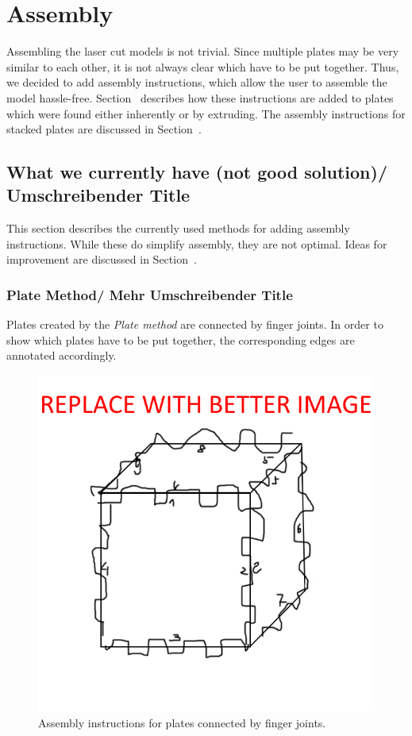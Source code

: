 \documentclass[../ClassicThesis.tex]{subfiles}
\begin{document}
\chapter{Assembly}\label{ch:assembly}

Assembling the laser cut models is not trivial. Since multiple plates may be very similar to each other, it is not always clear which have to be put together. Thus, we decided to add assembly instructions, which allow the user to assemble the model hassle-free. Section~ describes how these instructions are added to plates which were found either inherently or by extruding. The assembly instructions for stacked plates are discussed in Section~.

\section{What we currently have (not good solution)/ Umschreibender Title}

This section describes the currently used methods for adding assembly instructions. While these do simplify assembly, they are not optimal. Ideas for improvement are discussed in Section~.

\subsection{Plate Method/ Mehr Umschreibender Title}\label{sub:assemblyplates}

Plates created by the \emph{Plate method} \fabmethod are connected by finger joints. In order to show which plates have to be put together, the corresponding edges are annotated accordingly.

\begin{figure}
    \centering
    \includegraphics[width=0.5\columnwidth]{Images/assembly_plates.png}
    \caption{Assembly instructions for plates connected by finger joints.}
    \label{fig:assemblyplates}
\end{figure}
\end{document}
